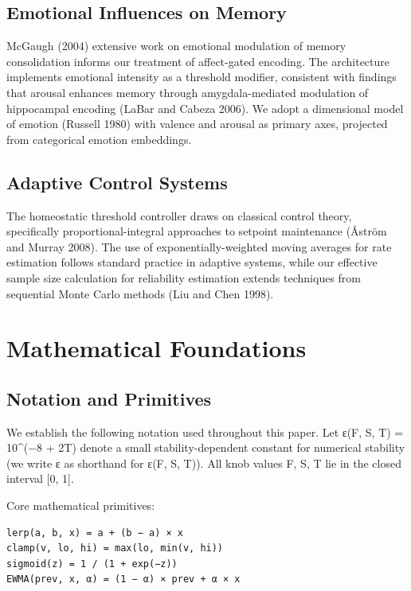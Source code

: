 \documentclass[
  letterpaper,
  DIV=11,
  numbers=noendperiod]{scrartcl}
\begin{document}
\subsection{Emotional Influences on
Memory}\label{emotional-influences-on-memory}

McGaugh (2004) extensive work on emotional modulation of memory
consolidation informs our treatment of affect-gated encoding. The
architecture implements emotional intensity as a threshold modifier,
consistent with findings that arousal enhances memory through
amygdala-mediated modulation of hippocampal encoding (LaBar and Cabeza
2006). We adopt a dimensional model of emotion (Russell 1980) with
valence and arousal as primary axes, projected from categorical emotion
embeddings.

\subsection{Adaptive Control Systems}\label{adaptive-control-systems}

The homeostatic threshold controller draws on classical control theory,
specifically proportional-integral approaches to setpoint maintenance
(Åström and Murray 2008). The use of exponentially-weighted moving
averages for rate estimation follows standard practice in adaptive
systems, while our effective sample size calculation for reliability
estimation extends techniques from sequential Monte Carlo methods (Liu
and Chen 1998).

\section{Mathematical Foundations}\label{sec-math}

\subsection{Notation and Primitives}\label{notation-and-primitives}

We establish the following notation used throughout this paper. Let ε(F,
S, T) = 10\^{}(−8 + 2T) denote a small stability-dependent constant for
numerical stability (we write ε as shorthand for ε(F, S, T)). All knob
values F, S, T lie in the closed interval {[}0, 1{]}.

Core mathematical primitives:

\begin{verbatim}
lerp(a, b, x) = a + (b − a) × x
clamp(v, lo, hi) = max(lo, min(v, hi))
sigmoid(z) = 1 / (1 + exp(−z))
EWMA(prev, x, α) = (1 − α) × prev + α × x
\end{verbatim}
\end{document}

